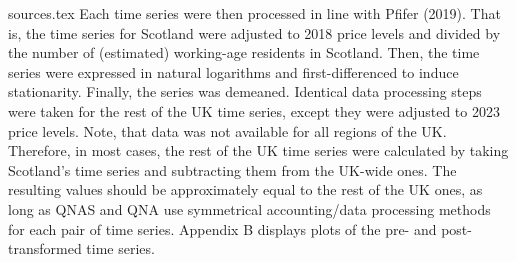 {sources.tex}
Each time series were then processed in line with Pfifer (2019). That is, the time series for Scotland were adjusted to 2018 price levels and divided by the number of (estimated) working-age residents in Scotland. Then, the time series were expressed in natural logarithms and first-differenced to induce stationarity. Finally, the series was demeaned. Identical data processing steps were taken for the rest of the UK time series, except they were adjusted to 2023 price levels. Note, that data was not available for all regions of the UK. Therefore, in most cases, the rest of the UK time series were calculated by taking Scotland's time series and subtracting them from the UK-wide ones. The resulting values should be approximately equal to the rest of the UK ones, as long as QNAS and QNA use symmetrical accounting/data processing methods for each pair of time series. Appendix B displays plots of the pre- and post-transformed time series.